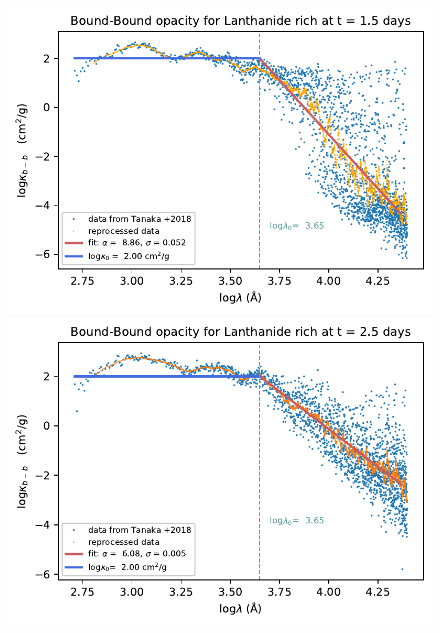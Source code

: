 \documentclass[a4paper, twoside, 11pt]{article}
\numberwithin{equation}{section}
\begin{document}
\begin{figure}[!h]
    \begin{minipage}[t]{0.5\textwidth}
    \advance\leftskip-1cm
        \includegraphics[scale=0.7]{pictures/LR/fit_LR_15.pdf}
        \subcaption{}
    \end{minipage}
    \begin{minipage}[t]{0.5\textwidth}
		\advance\leftskip-0.2cm
        \includegraphics[scale=0.7]{pictures/LR/fit_LR_25.pdf}
        \subcaption{}
    \end{minipage}
    \begin{minipage}[t]{0.5\textwidth}
          \advance\leftskip-1cm

\end{minipage}
\end{figure}
\end{document}
